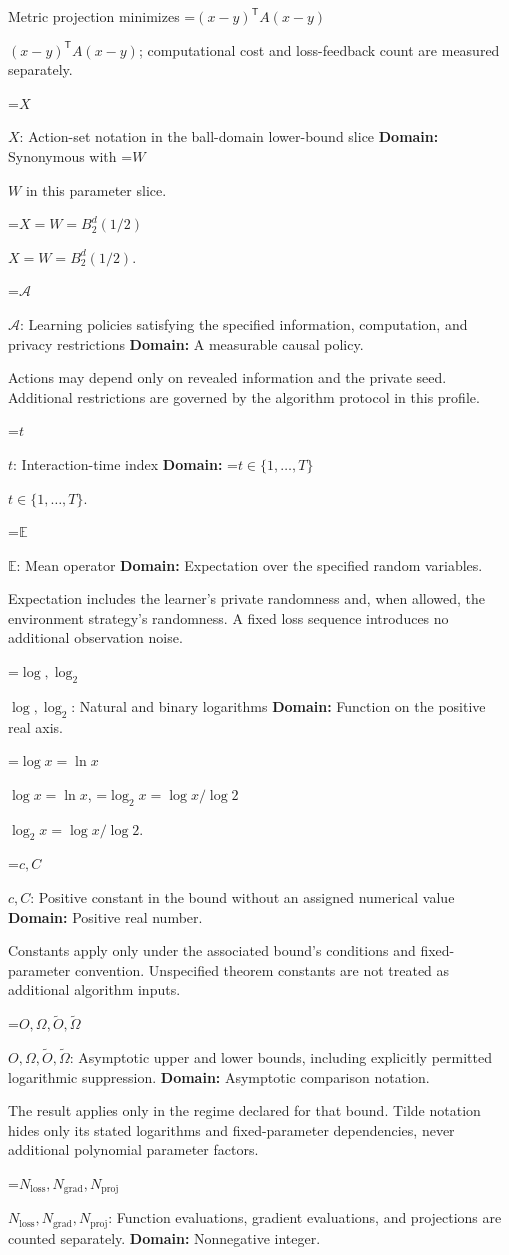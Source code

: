 \documentclass[10pt,a4paper]{article}
\newcommand{\AtlasMath}[1]{\par\begingroup\centering\setbox0=\hbox{$\displaystyle #1$}\ifdim\wd0>1.4\linewidth\typeout{ATLAS WIDE FORMULA: \the\wd0}\fi\ifdim\wd0>\linewidth\resizebox{\linewidth}{!}{\box0}\else\box0\fi\par\endgroup}
\newcommand{\AtlasInlineMath}[1]{\begingroup\setbox0=\hbox{$#1$}\ifdim\wd0>.4\linewidth\endgroup\AtlasMath{#1}\else\endgroup$#1$\fi}
\begin{document}
Metric projection minimizes \AtlasInlineMath{(x-y)^{\mathsf T}A(x-y)}; computational cost and loss-feedback count are measured separately.

\AtlasInlineMath{X}: Action-set notation in the ball-domain lower-bound slice \textbf{Domain:} Synonymous with \AtlasInlineMath{W} in this parameter slice.

\AtlasInlineMath{X=W=B_2^d(1/2)}.

\AtlasInlineMath{\mathcal A}: Learning policies satisfying the specified information, computation, and privacy restrictions \textbf{Domain:} A measurable causal policy.

Actions may depend only on revealed information and the private seed. Additional restrictions are governed by the algorithm protocol in this profile.

\AtlasInlineMath{t}: Interaction-time index \textbf{Domain:} \AtlasInlineMath{t\in\{1,\ldots,T\}}.

\AtlasInlineMath{\mathbb E}: Mean operator \textbf{Domain:} Expectation over the specified random variables.

Expectation includes the learner's private randomness and, when allowed, the environment strategy's randomness. A fixed loss sequence introduces no additional observation noise.

\AtlasInlineMath{\log,\log_2}: Natural and binary logarithms \textbf{Domain:} Function on the positive real axis.

\AtlasInlineMath{\log x=\ln x}, \AtlasInlineMath{\log_2x=\log x/\log2}.

\AtlasInlineMath{c,C}: Positive constant in the bound without an assigned numerical value \textbf{Domain:} Positive real number.

Constants apply only under the associated bound’s conditions and fixed-parameter convention. Unspecified theorem constants are not treated as additional algorithm inputs.

\AtlasInlineMath{O,\Omega,\widetilde O,\widetilde\Omega}: Asymptotic upper and lower bounds, including explicitly permitted logarithmic suppression. \textbf{Domain:} Asymptotic comparison notation.

The result applies only in the regime declared for that bound. Tilde notation hides only its stated logarithms and fixed-parameter dependencies, never additional polynomial parameter factors.

\AtlasInlineMath{N_{\mathrm{loss}},N_{\mathrm{grad}},N_{\mathrm{proj}}}: Function evaluations, gradient evaluations, and projections are counted separately. \textbf{Domain:} Nonnegative integer.
\end{document}
